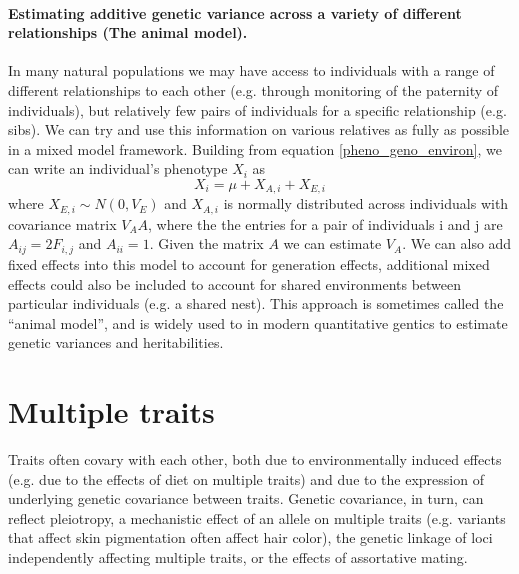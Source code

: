 \paragraph{Estimating additive genetic variance across a variety of
  different relationships (The animal model).}

In many natural populations we may have access to individuals with a
range of different relationships to each other (e.g. through monitoring
of the paternity of individuals), but relatively few pairs of individuals for a specific relationship (e.g. sibs). We can try and use this information on various relatives as
fully as possible in a mixed model framework. Building from equation
\ref{pheno_geno_environ}, we can write an individual's phenotype $X_i$
 as 
\begin{equation}
X_i =  \mu  + X_{A,i} + X_{E,i} 
\end{equation}
where $X_{E,i} \sim N(0,V_E)$  and $X_{A,i}$ is normally distributed across
individuals with covariance matrix $V_A A$, where the the entries for
a pair of individuals i and j are 
$A_{ij}= 2 F_{i,j}$ and $A_{ii}= 1$. Given the matrix $A$ we can estimate $V_A$. We can
also add fixed effects into this model to account for generation
effects, additional mixed effects could also be included to account
for shared environments between particular individuals (e.g. a shared nest).
This approach is sometimes called the ``animal model'', and is widely
used to in modern quantitative gentics to estimate genetic variances and heritabilities. 



\section{Multiple traits}
Traits often covary with each other, both due to environmentally
induced effects (e.g. due to the effects of diet on multiple traits)
and due to the expression of underlying genetic covariance between
traits. Genetic covariance, in turn, can reflect pleiotropy, a
mechanistic effect of an allele on multiple traits (e.g. variants that
affect skin pigmentation often affect hair color), the genetic
linkage of loci independently affecting multiple traits, or the
effects of assortative mating. 

